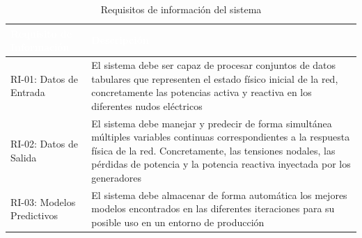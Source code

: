 \begin{table}[htp]
	\centering
	\renewcommand{\arraystretch}{1.3}
		\begin{tabular}{ | m{7cm} | m{8cm} | }
			\hline
			\rowcolor[HTML]{5B9BD5} 
			\textcolor{white}{\textbf{Requisito de Información}} & \textcolor{white}{\textbf{Descripción}}\\
			\hline
			
			RI-01: Datos de Entrada & El sistema debe ser capaz de procesar conjuntos de datos tabulares que representen el estado físico inicial de la red, concretamente las potencias activa y reactiva en los diferentes nudos eléctricos \\
			\hline
			RI-02: Datos de Salida & El sistema debe manejar y predecir de forma simultánea múltiples variables continuas correspondientes a la respuesta física de la red. Concretamente, las tensiones nodales, las pérdidas de potencia y la potencia reactiva inyectada por los generadores \\
			\hline
			RI-03: Modelos Predictivos & El sistema debe almacenar de forma automática los mejores modelos encontrados en las diferentes iteraciones para su posible uso en un entorno de producción \\
			\hline
			
		\end{tabular} 
		
		\caption{Requisitos de información del sistema}
	\end{table}